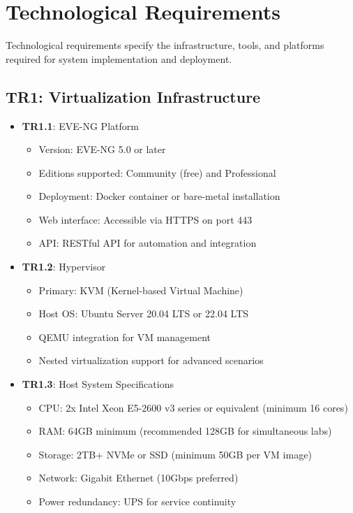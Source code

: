 \section{Technological Requirements}

Technological requirements specify the infrastructure, tools, and platforms required for system implementation and deployment.

\subsection{TR1: Virtualization Infrastructure}

\begin{itemize}

\item \textbf{TR1.1}: EVE-NG Platform
\begin{itemize}
\item Version: EVE-NG 5.0 or later
\item Editions supported: Community (free) and Professional
\item Deployment: Docker container or bare-metal installation
\item Web interface: Accessible via HTTPS on port 443
\item API: RESTful API for automation and integration
\end{itemize}

\item \textbf{TR1.2}: Hypervisor
\begin{itemize}
\item Primary: KVM (Kernel-based Virtual Machine)
\item Host OS: Ubuntu Server 20.04 LTS or 22.04 LTS
\item QEMU integration for VM management
\item Nested virtualization support for advanced scenarios
\end{itemize}

\item \textbf{TR1.3}: Host System Specifications
\begin{itemize}
\item CPU: 2x Intel Xeon E5-2600 v3 series or equivalent (minimum 16 cores)
\item RAM: 64GB minimum (recommended 128GB for simultaneous labs)
\item Storage: 2TB+ NVMe or SSD (minimum 50GB per VM image)
\item Network: Gigabit Ethernet (10Gbps preferred)
\item Power redundancy: UPS for service continuity
\end{itemize}


\end{itemize}
